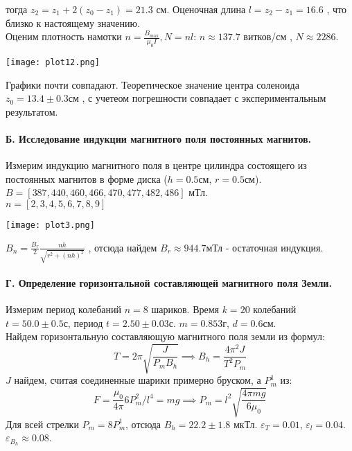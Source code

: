\documentclass[10pt]{article}
\begin{document}
\begin{enumerate}
            тогда $z_2 = z_1 + 2(z_0 - z_1) = 21.3$ см. Оценочная длина $l = z_2 - z_1 = 16.6$ , что близко к настоящему значению.\\
            Оценим плотность намотки $n = \frac{B_{\max}}{\mu_0 I}, N = nl$: $n \approx 137.7$ витков/см , $N \approx 2286$.
            \begin{center}
            \texttt{[image: plot12.png]}
            \end{center}
            Графики почти совпадают. Теоретическое значение центра соленоида $z_0 = 13.4 \pm 0.3$см , с учетеом погрешности совпадает с экспериментальным результатом.
    \end{enumerate}

\paragraph{\large {Б. Исследование индукции магнитного поля постоянных магнитов.\\}} 
 
Измерим индукцию магнитного поля в центре цилиндра состоящего из постоянных магнитов в форме диска ($h=0.5$см, $r=0.5$см). \\
$B = [387,440,460,466,470,477,482,486]$ мТл. \\
$n = [2, 3, 4, 5, 6, 7, 8, 9]$ 
\begin{center}
        \texttt{[image: plot3.png]}
\end{center}
$B_n = \frac{B_r}{2} \frac{nh}{\sqrt{r^2 + (nh)^2}}$ , отсюда найдем $B_r \approx 944.7$мТл - остаточная индукция.


\paragraph{\large {Г. Определение горизонтальной составляющей магнитного поля Земли.\\}}

Измерим период колебаний $n=8$ шариков. Время $k = 20$ колебаний $t = 50.0 \pm 0.5$с, период $t = 2.50 \pm 0.03$с. $m = 0.853$г, $d = 0.6$см. \\
Найдем горизонтальную составляющую магнитного поля земли из формул:
\begin{equation}
T = 2 \pi \sqrt{\frac{J}{P_m B_h}} \implies B_h = \frac{4 \pi^2 J}{T^2 P_m}
\end{equation} 
$J$ найдем, считая соединенные шарики примерно бруском, а $P^1_m$ из:
\begin{equation}
    F = \frac{\mu_0}{4 \pi} 6 P_m^2/l^4 = mg \implies P_m = l^2 \sqrt{\frac{4 \pi mg}{6\mu_0}}
\end{equation}
Для всей стрелки $P_m = 8P^1_m$, отсюда $B_h = 22.2 \pm 1.8$ мкТл. $\varepsilon_T = 0.01$, $\varepsilon_l = 0.04$.\\
$\varepsilon_{B_h} \approx 0.08$.
\end{document}
